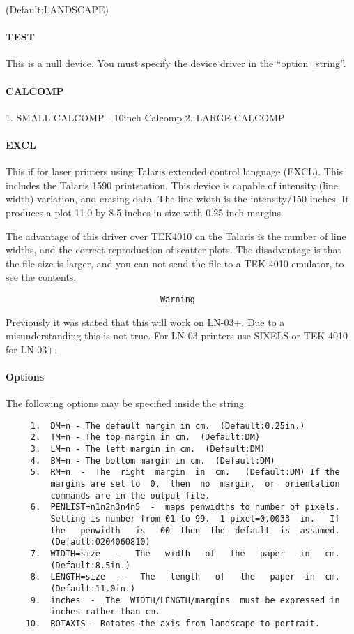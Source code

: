 (Default:LANDSCAPE) 
\paragraph{TEST}
This  is  a  null  device.  You must specify the device driver in the
``option\_string''.  
\paragraph{CALCOMP}
1.  SMALL CALCOMP - 10inch Calcomp 
2.  LARGE CALCOMP 
\paragraph{EXCL}
This  if  for  laser printers using Talaris extended control language
(EXCL).  This includes the Talaris 1590 printstation.  This device is
capable  of  intensity (line width) variation, and erasing data.  The
line width is the intensity/150 inches.  It produces a plot  11.0  by
8.5 inches in size with 0.25 inch margins.  

The  advantage  of  this  driver  over  TEK4010 on the Talaris is the
number of line widths, and the correct reproduction of scatter plots.
The  disadvantage  is  that  the file size is larger, and you can not
send the file to a TEK-4010 emulator, to see the contents.  
\begin{verbatim}
                               Warning
\end{verbatim}
Previously  it  was  stated  that this will work on LN-03+.  Due to a
misunderstanding this is not true.  For LN-03 printers use SIXELS  or
TEK-4010 for LN-03+.  
\paragraph{Options}
The following options may be specified inside the string:  
\begin{verbatim}
     1.  DM=n - The default margin in cm.  (Default:0.25in.) 
     2.  TM=n - The top margin in cm.  (Default:DM) 
     3.  LM=n - The left margin in cm.  (Default:DM) 
     4.  BM=n - The bottom margin in cm.  (Default:DM) 
     5.  RM=n  -  The  right  margin  in  cm.   (Default:DM) If the
         margins are set to  0,  then  no  margin,  or  orientation
         commands are in the output file.  
     6.  PENLIST=n1n2n3n4n5  -  maps penwidths to number of pixels.
         Setting is number from 01 to 99.  1 pixel=0.0033  in.   If
         the   penwidth   is   00  then  the  default  is  assumed.
         (Default:0204060810) 
     7.  WIDTH=size   -   The   width   of   the   paper   in   cm.
         (Default:8.5in.) 
     8.  LENGTH=size   -   The   length   of   the   paper  in  cm.
         (Default:11.0in.) 
     9.  inches  -  The  WIDTH/LENGTH/margins  must be expressed in
         inches rather than cm.  
    10.  ROTAXIS - Rotates the axis from landscape to portrait.  
\end{verbatim}
